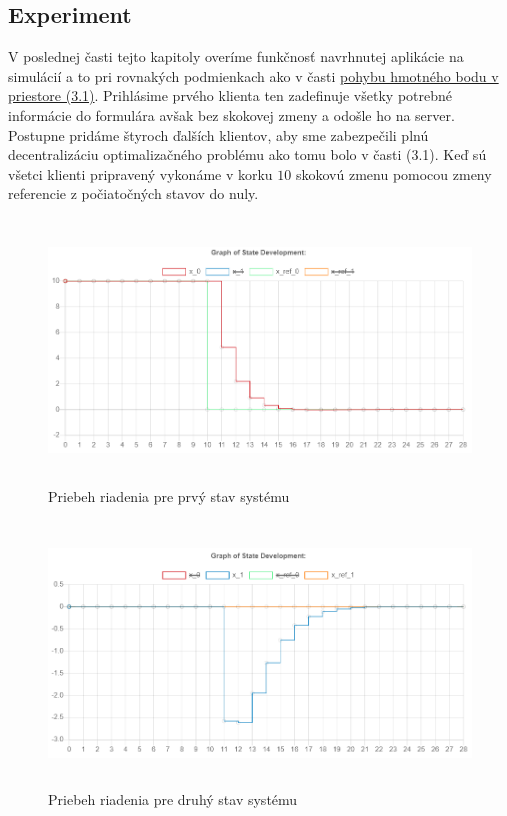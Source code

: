 \subsection{Experiment}
V poslednej časti tejto kapitoly overíme funkčnosť navrhnutej aplikácie na simulácií a to pri rovnakých podmienkach ako v časti \hyperref[sec:HB]{pohybu hmotného bodu v priestore (3.1)}. Prihlásime prvého klienta ten zadefinuje všetky potrebné informácie do formulára avšak bez skokovej zmeny a odošle ho na server. Postupne pridáme štyroch ďalších klientov, aby sme zabezpečili plnú decentralizáciu optimalizačného problému ako tomu bolo v časti (3.1). Keď sú všetci klienti pripravený vykonáme v korku $10$ skokovú zmenu pomocou zmeny referencie z počiatočných stavov do nuly.
\begin{figure}[H]
	\centering
	\includegraphics[width=13cm,height=7cm]{images/Hmotny_bod_apk/x0}
	\caption{Priebeh riadenia pre prvý stav systému}
\end{figure}
\begin{figure}[H]
	\centering
	\includegraphics[width=13cm,height=7cm]{images/Hmotny_bod_apk/x1}
	\caption{Priebeh riadenia pre druhý stav systému}
\end{figure}
